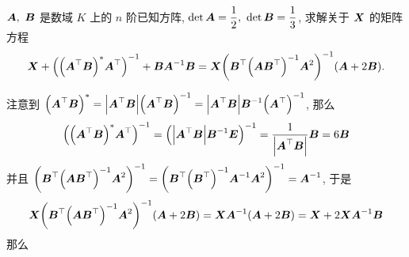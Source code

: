 \begin{example}
    $\vb*{A},~\vb*{B}$ 是数域 $K$ 上的 $n$ 阶已知方阵, $\det \vb*{A}=\dfrac{1}{2},~\det\vb*{B}=\dfrac{1}{3}$, 求解关于 $\vb*{X}$ 的矩阵方程
    $$\vb*{X}+\qty(\qty(\vb*{A}^\top\vb*{B})^*\vb*{A}^\top)^{-1}+\vb*{BA}^{-1}\vb*{B}=\vb*{X}\qty(\vb*{B}^\top\qty(\vb*{AB}^\top)^{-1}\vb*{A}^2)^{-1}(\vb*{A}+2\vb*{B}).$$
\end{example}
\begin{solution}
    注意到 $\qty(\vb*{A}^\top\vb*{B})^*=\qty|\vb*{A}^\top\vb*{B}|\qty(\vb*{A}^\top\vb*{B})^{-1}=\qty|\vb*{A}^\top\vb*{B}|\vb*{B}^{-1}\qty(\vb*{A}^\top)^{-1}$,
    那么 $$\qty(\qty(\vb*{A}^\top\vb*{B})^*\vb*{A}^\top)^{-1}=\qty(\qty|\vb*{A}^\top\vb*{B}|\vb*{B}^{-1}\vb*{E})^{-1}=\dfrac{1}{\qty|\vb*{A}^\top\vb*{B}|}\vb*{B}=6\vb*{B}$$
    并且 $\qty(\vb*{B}^\top\qty(\vb*{AB}^\top)^{-1}\vb*{A}^2)^{-1}=\qty(\vb*{B}^\top\qty(\vb*{B}^\top)^{-1}\vb*{A}^{-1}\vb*{A}^2)^{-1}=\vb*{A}^{-1}$, 于是
    $$\vb*{X}\qty(\vb*{B}^\top\qty(\vb*{AB}^\top)^{-1}\vb*{A}^2)^{-1}(\vb*{A}+2\vb*{B})=\vb*{X}\vb*{A}^{-1}\qty(\vb*{A}+2\vb*{B})=\vb*{X}+2\vb*{XA}^{-1}\vb*{B}$$
    那么 
\end{solution}

